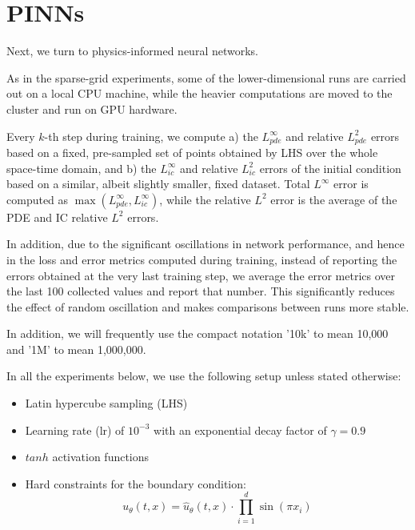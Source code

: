 \section{PINNs}

Next, we turn to physics-informed neural networks.


As in the sparse-grid experiments, some of the lower-dimensional runs are carried out on a local CPU machine,
while the heavier computations are moved to the cluster and run on GPU hardware.

Every $k$-th step during training, we compute a)
the $L^\infty_{pde}$ and relative $L^2_{pde}$ errors based on a fixed, pre-sampled
set of points obtained by LHS over the whole space-time domain, and b) the $L^\infty_{ic}$ and relative $L^2_{ic}$ errors
of the initial condition based on a similar, albeit slightly smaller, fixed dataset.
Total $L^\infty$ error is computed as $\max(L^\infty_{pde}, L^\infty_{ic})$,
while the relative $L^2$ error is the average of the PDE and IC relative $L^2$ errors.

In addition, due to the significant oscillations in network performance,
and hence in the loss and error metrics computed during training,
instead of reporting the errors obtained at the very last training step, we
average the error metrics over the last 100 collected values and report that number.
This significantly reduces the effect of random oscillation and makes comparisons between runs more stable.

In addition, we will frequently use the compact notation '10k' to mean 10,000 and '1M' to mean 1,000,000.

In all the experiments below, we use the following setup unless stated otherwise:

\begin{itemize}
\item Latin hypercube sampling (LHS)
\item Learning rate (lr) of $10^{-3}$ with an exponential decay factor of $\gamma=0.9$
\item $tanh$ activation functions
\item Hard constraints for the boundary condition:
$$
u_\theta(t,x) = \hat{u}_\theta(t,x) \cdot \prod_{i=1}^d \sin(\pi x_i)
$$
\end{itemize}

